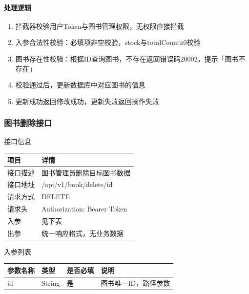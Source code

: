 \documentclass[12pt, a4paper]{article}
\begin{document}
\paragraph{处理逻辑}
\begin{enumerate}
\item 拦截器校验用户Token与图书管理权限，无权限直接拦截

\item 入参合法性校验：必填项非空校验，stock与totalCount≥0校验

\item 图书存在性校验：根据ID查询图书，不存在返回错误码20002，提示「图书不存在」

\item 校验通过后，更新数据库中对应图书的信息

\item 更新成功返回修改成功，更新失败返回操作失败
\end{enumerate}

\newpage
\subsubsection{图书删除接口}
\begin{center}
    接口信息
\end{center}
\begin{table}[H]
    \centering
    \begin{tabular}{|l|l|}
        \hline
        项目 & 详情 \\
        \hline
        接口描述 & 图书管理员删除目标图书数据 \\
        \hline
        接口地址 & /api/v1/book/delete/{id} \\
        \hline
        请求方式 & DELETE \\
        \hline
        请求头 & Authorization: Bearer {Token} \\
        \hline
        入参 & 见下表 \\
        \hline
        出参 & 统一响应格式，无业务数据 \\
        \hline
    \end{tabular}
\end{table}

入参列表

\begin{table}[H]
    \centering
    \begin{tabular}{|l|l|l|l|}
        \hline
        参数名称 & 类型 & 是否必填 & 说明 \\
        \hline
        id & String & 是 & 图书唯一ID，路径参数 \\
        \hline
    \end{tabular}
\end{table}
\end{document}
